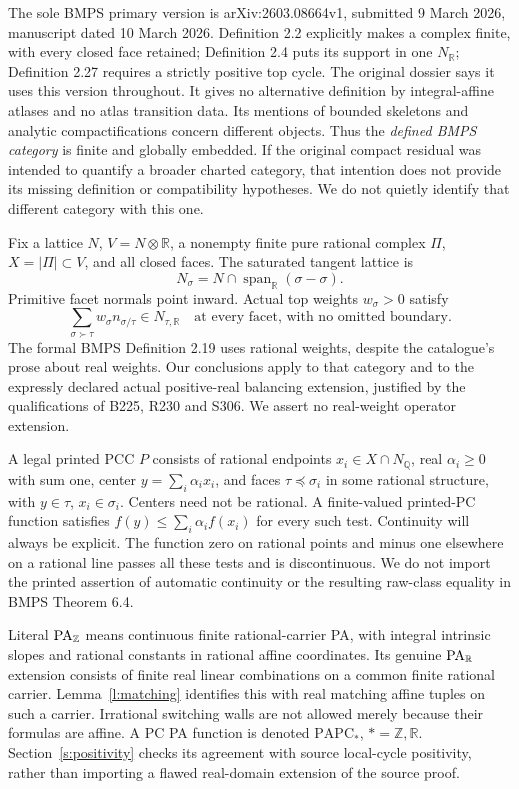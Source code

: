 \documentclass[11pt]{article}
\newcommand{\R}{\mathbb R}\newcommand{\Q}{\mathbb Q}\newcommand{\Z}{\mathbb Z}
\begin{document}
The sole BMPS primary version is arXiv:2603.08664v1, submitted 9 March 2026, manuscript dated 10 March 2026. Definition 2.2 explicitly makes a complex finite, with every closed face retained; Definition 2.4 puts its support in one $N_\R$; Definition 2.27 requires a strictly positive top cycle. The original dossier says it uses this version throughout. It gives no alternative definition by integral-affine atlases and no atlas transition data. Its mentions of bounded skeletons and analytic compactifications concern different objects. Thus the \emph{defined BMPS category} is finite and globally embedded. If the original compact residual was intended to quantify a broader charted category, that intention does not provide its missing definition or compatibility hypotheses. We do not quietly identify that different category with this one.

Fix a lattice $N$, $V=N\otimes\R$, a nonempty finite pure rational complex $\Pi$, $X=|\Pi|\subset V$, and all closed faces. The saturated tangent lattice is
\[
 N_\sigma=N\cap\operatorname{span}_\R(\sigma-\sigma).
\]
Primitive facet normals point inward. Actual top weights $w_\sigma>0$ satisfy
\[
 \sum_{\sigma\succ\tau}w_\sigma n_{\sigma/\tau}\in N_{\tau,\R}
 \quad\text{at every facet, with no omitted boundary.}                 \tag{1.1}
\]
The formal BMPS Definition 2.19 uses rational weights, despite the catalogue's prose about real weights. Our conclusions apply to that category and to the expressly declared actual positive-real balancing extension, justified by the qualifications of B225, R230 and S306. We assert no real-weight operator extension.

A legal printed PCC $P$ consists of rational endpoints $x_i\in X\cap N_\Q$, real $\alpha_i\geq0$ with sum one, center $y=\sum_i\alpha_i x_i$, and faces $\tau\preceq\sigma_i$ in some rational structure, with $y\in\tau$, $x_i\in\sigma_i$. Centers need not be rational. A finite-valued printed-PC function satisfies $f(y)\leq\sum_i\alpha_i f(x_i)$ for every such test. Continuity will always be explicit. The function zero on rational points and minus one elsewhere on a rational line passes all these tests and is discontinuous. We do not import the printed assertion of automatic continuity or the resulting raw-class equality in BMPS Theorem 6.4.

Literal $\PA_\Z$ means continuous finite rational-carrier PA, with integral intrinsic slopes and rational constants in rational affine coordinates. Its genuine $\PA_\R$ extension consists of finite real linear combinations on a common finite rational carrier. Lemma~\ref{l:matching} identifies this with real matching affine tuples on such a carrier. Irrational switching walls are not allowed merely because their formulas are affine. A PC PA function is denoted $\mathrm{PAPC}_*$, $*=\Z,\R$. Section~\ref{s:positivity} checks its agreement with source local-cycle positivity, rather than importing a flawed real-domain extension of the source proof.
\end{document}
